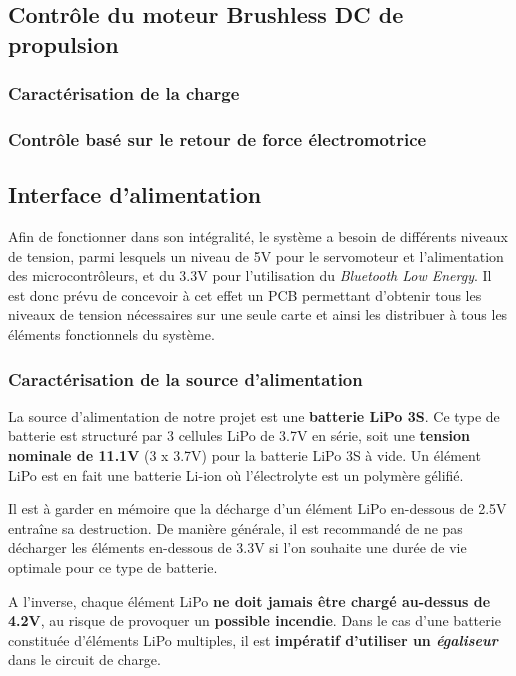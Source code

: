 \documentclass[a4paper,12pt]{report}
\begin{document}
		\subsection{Contrôle du moteur Brushless DC de propulsion}
		
			\subsubsection{Caractérisation de la charge}
			
			\subsubsection{Contrôle basé sur le retour de force électromotrice}
	
		\subsection{Interface d'alimentation}
		
		Afin de fonctionner dans son intégralité, le système a besoin de différents niveaux de tension, parmi lesquels un niveau de 5V pour le servomoteur et l'alimentation des microcontrôleurs, et du 3.3V pour l'utilisation du \textit{Bluetooth Low Energy}. Il est donc prévu de concevoir à cet effet un PCB permettant d'obtenir tous les niveaux de tension nécessaires sur une seule carte et ainsi les distribuer à tous les éléments fonctionnels du système.
		
			\subsubsection{Caractérisation de la source d'alimentation}
			
			La source d'alimentation de notre projet est une \textbf{batterie LiPo 3S}. Ce type de batterie est structuré par 3 cellules LiPo de 3.7V en série, soit une \textbf{tension nominale de 11.1V} (3 x 3.7V) pour la batterie LiPo 3S à vide. Un élément LiPo est en fait une batterie Li-ion où l'électrolyte est un polymère gélifié.
			
			Il est à garder en mémoire que la décharge d'un élément LiPo en-dessous de 2.5V entraîne sa destruction. De manière générale, il est recommandé de ne pas décharger les éléments en-dessous de 3.3V si l'on souhaite une durée de vie optimale pour ce type de batterie. 
			
		A l'inverse, chaque élément LiPo \textbf{ne doit jamais être chargé au-dessus de 4.2V}, au risque de provoquer un \textbf{possible incendie}. Dans le cas d'une batterie constituée d'éléments LiPo multiples, il est \textbf{impératif d'utiliser un \textit{égaliseur}} dans le circuit de charge.
		
\end{document}
